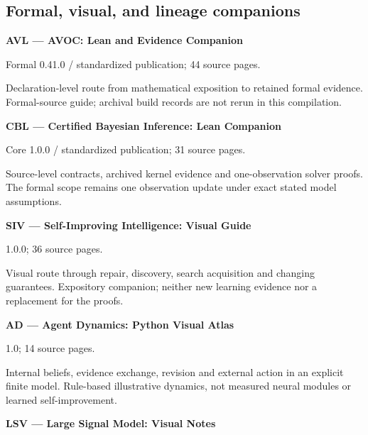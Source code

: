 \subsection*{Formal, visual, and lineage companions}

\hypertarget{cat:AVL}{}\textbf{AVL --- AVOC: Lean and Evidence Companion}\par

Formal 0.41.0 / standardized publication; 44 source pages.\par

Declaration-level route from mathematical exposition to retained formal evidence. Formal-source guide; archival build records are not rerun in this compilation.\par

\hypertarget{cat:CBL}{}\textbf{CBL --- Certified Bayesian Inference: Lean Companion}\par

Core 1.0.0 / standardized publication; 31 source pages.\par

Source-level contracts, archived kernel evidence and one-observation solver proofs. The formal scope remains one observation update under exact stated model assumptions.\par

\hypertarget{cat:SIV}{}\textbf{SIV --- Self-Improving Intelligence: Visual Guide}\par

1.0.0; 36 source pages.\par

Visual route through repair, discovery, search acquisition and changing guarantees. Expository companion; neither new learning evidence nor a replacement for the proofs.\par

\hypertarget{cat:AD}{}\textbf{AD --- Agent Dynamics: Python Visual Atlas}\par

1.0; 14 source pages.\par

Internal beliefs, evidence exchange, revision and external action in an explicit finite model. Rule-based illustrative dynamics, not measured neural modules or learned self-improvement.\par

\hypertarget{cat:LSV}{}\textbf{LSV --- Large Signal Model: Visual Notes}\par

